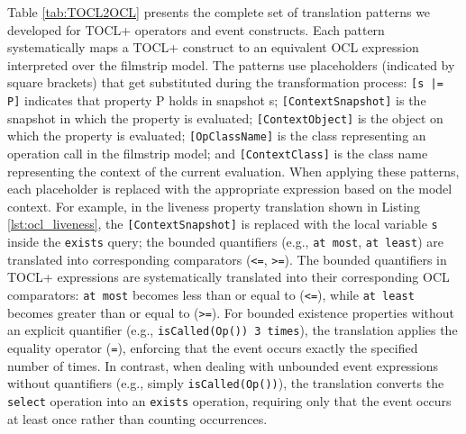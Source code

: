 Table \ref{tab:TOCL2OCL} presents the complete set of translation patterns we 
developed for TOCL+ operators and event constructs. Each pattern systematically 
maps a TOCL+ construct to an equivalent OCL expression interpreted over the filmstrip 
model. The patterns use placeholders (indicated by square brackets) that get 
substituted during the transformation process: \texttt{[s |= P]} indicates that 
property P holds in snapshot s; \texttt{[ContextSnapshot]} is the snapshot in which 
the property is evaluated; \texttt{[ContextObject]} is the object on which the 
property is evaluated; \texttt{[OpClassName]} is the class representing an 
operation call in the filmstrip model; and \texttt{[ContextClass]} is the class name
representing the context of the current evaluation. When applying these patterns, 
each placeholder is replaced with the appropriate expression based on the model 
context. For example, in the liveness property translation shown in Listing 
\ref{lst:ocl_liveness}, the \texttt{[ContextSnapshot]} is replaced with the local variable 
\texttt{s} inside the \texttt{exists} query; the bounded quantifiers (e.g., \texttt{at most}, 
\texttt{at least}) are translated into corresponding comparators (\texttt{<=}, \texttt{>=}). 
The bounded quantifiers in TOCL+ expressions are systematically translated into their 
corresponding OCL comparators: \texttt{at most} becomes less than or equal to 
(\texttt{<=}), while \texttt{at least} becomes greater than or equal to (\texttt{>=}). 
For bounded existence properties without an explicit quantifier (e.g., 
\texttt{isCalled(Op()) 3 times}), the translation applies the equality operator 
(\texttt{=}), enforcing that the event occurs exactly the specified number of times. 
In contrast, when dealing with unbounded event expressions without quantifiers (e.g., 
simply \texttt{isCalled(Op())}), the translation converts the \texttt{select} operation 
into an \texttt{exists} operation, requiring only that the event occurs at least once 
rather than counting occurrences.
    
